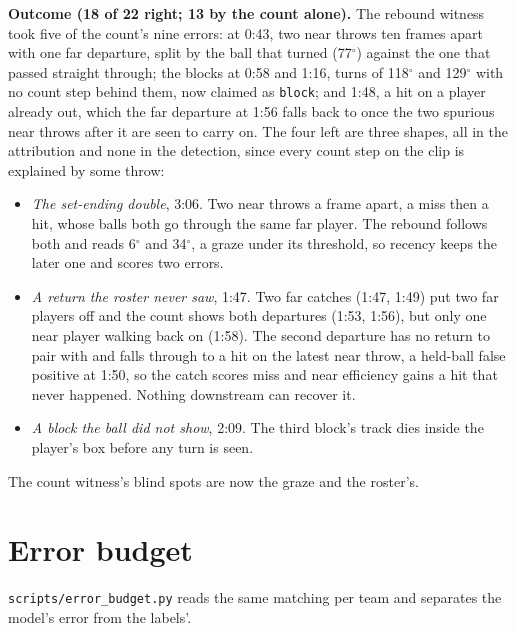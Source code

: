 \documentclass[10pt,a4paper]{article}
\begin{document}
\textbf{Outcome (18 of 22 right; 13 by the count alone).} The rebound witness took five
of the count's nine errors: at 0:43, two near throws ten frames apart with one far
departure, split by the ball that turned (77$^\circ$) against the one that passed straight
through; the blocks at 0:58 and 1:16, turns of 118$^\circ$ and 129$^\circ$ with no count
step behind them, now claimed as \texttt{block}; and 1:48, a hit on a player already out,
which the far departure at 1:56 falls back to once the two spurious near throws after it
are seen to carry on. The four left are three shapes, all in the attribution and none in
the detection, since every count step on the clip is explained by some throw:

\begin{itemize}
\item \emph{The set-ending double}, 3:06. Two near throws a frame apart, a miss then a
hit, whose balls both go through the same far player. The rebound follows both and reads
6$^\circ$ and 34$^\circ$, a graze under its threshold, so recency keeps the later one and
scores two errors.
\item \emph{A return the roster never saw}, 1:47. Two far catches (1:47, 1:49) put two far
players off and the count shows both departures (1:53, 1:56), but only one near player
walking back on (1:58). The second departure has no return to pair with and falls through
to a hit on the latest near throw, a held-ball false positive at 1:50, so the catch scores
miss and near efficiency gains a hit that never happened. Nothing downstream can recover
it.
\item \emph{A block the ball did not show}, 2:09. The third block's track dies inside the
player's box before any turn is seen.
\end{itemize}

The count witness's blind spots are now the graze and the roster's.

\section{Error budget}
\label{sec:budget}

\texttt{scripts/error\_budget.py} reads the same matching per team and separates the
model's error from the labels'.
\end{document}
